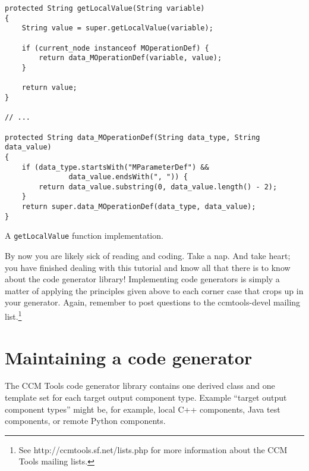 \begin{Example}
\begin{minifbox}
\begin{small}
\begin{verbatim}
protected String getLocalValue(String variable)
{
    String value = super.getLocalValue(variable);

    if (current_node instanceof MOperationDef) {
        return data_MOperationDef(variable, value);
    }

    return value;
}

// ...

protected String data_MOperationDef(String data_type, String data_value)
{
    if (data_type.startsWith("MParameterDef") &&
               data_value.endsWith(", ")) {
        return data_value.substring(0, data_value.length() - 2);
    }
    return super.data_MOperationDef(data_type, data_value);
}
\end{verbatim}
\end{small}
\end{minifbox}
\caption{A {\tt getLocalValue} function implementation.}
\label{example:component-localvalue-implementation}
\end{Example}

By now you are likely sick of reading and coding. Take a nap. And take heart;
you have finished dealing with this tutorial and know all that there is to know
about the code generator library! Implementing code generators is simply a
matter of applying the principles given above to each corner case that crops up
in your generator. Again, remember to post questions to the ccmtools-devel
mailing list.\footnote{See http://ccmtools.sf.net/lists.php for more information
about the CCM Tools mailing lists.}

\section{Maintaining a code generator}

The CCM Tools code generator library contains one derived class and one template
set for each target output component type. Example ``target output component
types'' might be, for example, local C++ components, Java test components, or
remote Python components.

